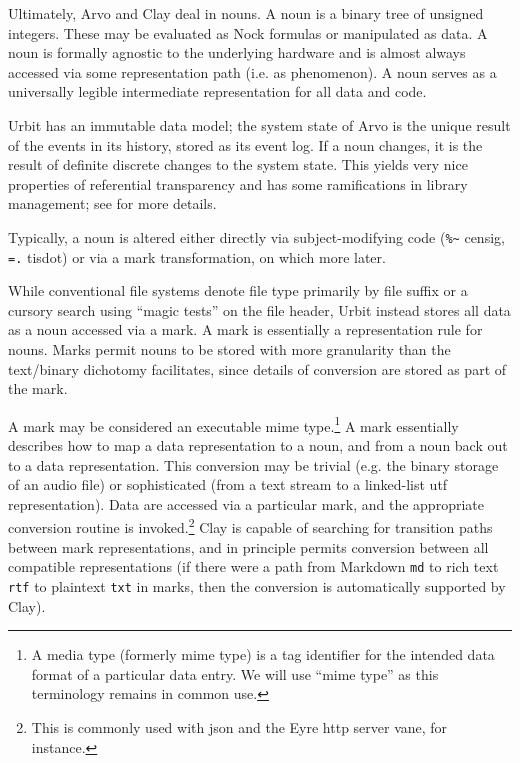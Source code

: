 \documentclass[twoside]{article}
\begin{document}
Ultimately, Arvo and Clay deal in nouns.  A noun is a binary tree of unsigned integers.  These may be evaluated as Nock formulas or manipulated as data.  A noun is formally agnostic to the underlying hardware and is almost always accessed via some representation path (i.e. as phenomenon).  A noun serves as a universally legible intermediate representation for all data and code.

Urbit has an immutable data model; the system state of Arvo is the unique result of the events in its history, stored as its event log.  If a noun changes, it is the result of definite discrete changes to the system state.  This yields very nice properties of referential transparency and has some ramifications in library management; see \citet{Blackman2024a} for more details.

Typically, a noun is altered either directly via subject-modi\-fying code (\lstinline[style=inlinecode]{%~} censig, \lstinline[style=inlinecode]{=.} tisdot) or via a mark transformation, on which more later.

While conventional file systems denote file type primarily by file suffix or a cursory search using “magic tests” on the file header, Urbit instead stores all data as a noun accessed via a mark.  A mark is essentially a representation rule for nouns.  Marks permit nouns to be stored with more granularity than the text/binary dichotomy facilitates, since details of conversion are stored as part of the mark.

A mark may be considered an executable {\sc mime} type.\footnote{A media type (formerly {\sc mime} type) is a tag identifier for the intended data format of a particular data entry. We will use “{\sc mime} type” as this terminology remains in common use.}  A mark essentially describes how to map a data representation to a noun, and from a noun back out to a data representation.  This conversion may be trivial (e.g. the binary storage of an audio file) or sophisticated (from a text stream to a linked-list {\sc utf} representation).  Data are accessed via a particular mark, and the appropriate conversion routine is invoked.\footnote{This is commonly used with {\sc json} and the Eyre {\sc http} server vane, for instance.}  Clay is capable of searching for transition paths between mark representations, and in principle permits conversion between all compatible representations (if there were a path from Markdown \texttt{md} to rich text \texttt{rtf} to plaintext \texttt{txt} in marks, then the conversion is automatically supported by Clay).
\end{document}
